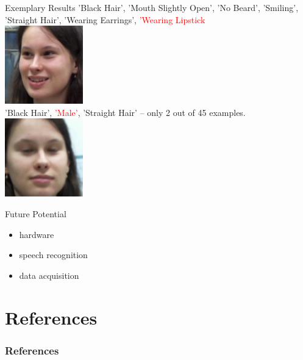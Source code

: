 \documentclass{beamer}
\begin{document}
\begin{frame}{Exemplary Results}
'Black Hair', 'Mouth Slightly Open', 'No Beard', 'Smiling', 'Straight Hair', 'Wearing Earrings', \textcolor{red}{'Wearing Lipstick}
 \\
 \centering
\includegraphics[height=0.3\textheight]{figures/leti_normalised24}\\
'Black Hair', \textcolor{red}{'Male'}, 'Straight Hair' -- only 2 out of 45 examples. \\
\centering
\includegraphics[height=0.3\textheight]{figures/leti_normalised0}
\end{frame}

\begin{frame}{Future Potential}
\begin{itemize}
 \item hardware
 \item speech recognition
 \item data acquisition
\end{itemize}

\end{frame}



\section{References}
\begin{frame}
	\frametitle{References}
	\footnotesize
	
\end{frame}
\end{document}
